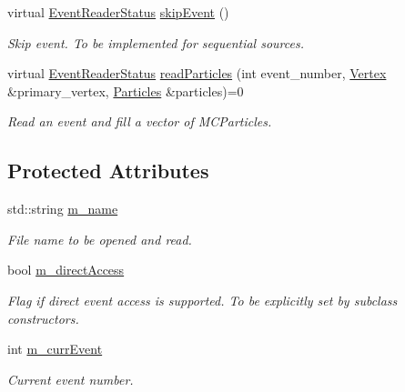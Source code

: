 \begin{DoxyCompactItemize}
virtual \hyperlink{class_d_d4hep_1_1_simulation_1_1_geant4_event_reader_ae4f4bc83ffcf5b0c1868ad78859851e7}{Event\+Reader\+Status} \hyperlink{class_d_d4hep_1_1_simulation_1_1_geant4_event_reader_a9381626ad4f4fa20e304414f6654ee03}{skip\+Event} ()
\begin{DoxyCompactList}\small\item\em Skip event. To be implemented for sequential sources. \end{DoxyCompactList}\item 
virtual \hyperlink{class_d_d4hep_1_1_simulation_1_1_geant4_event_reader_ae4f4bc83ffcf5b0c1868ad78859851e7}{Event\+Reader\+Status} \hyperlink{class_d_d4hep_1_1_simulation_1_1_geant4_event_reader_ac72f293d08b3a2cd9228f56638656613}{read\+Particles} (int event\+\_\+number, \hyperlink{class_d_d4hep_1_1_simulation_1_1_geant4_event_reader_ac9738208fe520e5aa2ad1efa13de82e7}{Vertex} \&primary\+\_\+vertex, \hyperlink{class_d_d4hep_1_1_simulation_1_1_geant4_event_reader_afa252e93d319aef2810a17aa78bb4603}{Particles} \&particles)=0
\begin{DoxyCompactList}\small\item\em Read an event and fill a vector of M\+C\+Particles. \end{DoxyCompactList}\end{DoxyCompactItemize}
\subsection*{Protected Attributes}
\begin{DoxyCompactItemize}
\item 
std\+::string \hyperlink{class_d_d4hep_1_1_simulation_1_1_geant4_event_reader_a0a6ea787174ce598d22ce1616c1f25af}{m\+\_\+name}
\begin{DoxyCompactList}\small\item\em File name to be opened and read. \end{DoxyCompactList}\item 
bool \hyperlink{class_d_d4hep_1_1_simulation_1_1_geant4_event_reader_a1902827774d01fd87f38cbee29696fe0}{m\+\_\+direct\+Access}
\begin{DoxyCompactList}\small\item\em Flag if direct event access is supported. To be explicitly set by subclass constructors. \end{DoxyCompactList}\item 
int \hyperlink{class_d_d4hep_1_1_simulation_1_1_geant4_event_reader_a3f1446121fae285cd2772ca9bd1d8af3}{m\+\_\+curr\+Event}
\begin{DoxyCompactList}\small\item\em Current event number. \end{DoxyCompactList}\end{DoxyCompactItemize}


